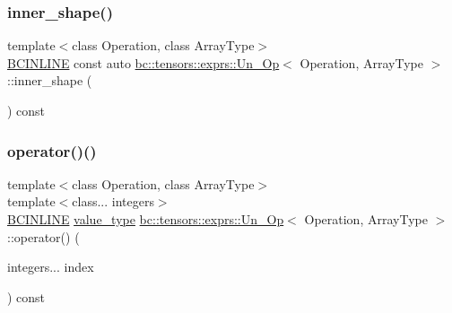 \subsubsection{\texorpdfstring{inner\+\_\+shape()}{inner\_shape()}}
{\footnotesize\ttfamily template$<$class Operation, class Array\+Type$>$ \\
\hyperlink{common_8h_a6699e8b0449da5c0fafb878e59c1d4b1}{B\+C\+I\+N\+L\+I\+NE} const auto \hyperlink{structbc_1_1tensors_1_1exprs_1_1Un__Op}{bc\+::tensors\+::exprs\+::\+Un\+\_\+\+Op}$<$ Operation, Array\+Type $>$\+::inner\+\_\+shape (\begin{DoxyParamCaption}{ }\end{DoxyParamCaption}) const\hspace{0.3cm}{\ttfamily [inline]}}

\mbox{\label{structbc_1_1tensors_1_1exprs_1_1Un__Op_a7c9d055f60de762c1b5e2eb46f1603f2}} 
\subsubsection{\texorpdfstring{operator()()}{operator()()}\hspace{0.1cm}{\footnotesize\ttfamily [1/2]}}
{\footnotesize\ttfamily template$<$class Operation, class Array\+Type$>$ \\
template$<$class... integers$>$ \\
\hyperlink{common_8h_a6699e8b0449da5c0fafb878e59c1d4b1}{B\+C\+I\+N\+L\+I\+NE} \hyperlink{structbc_1_1tensors_1_1exprs_1_1Un__Op_a8c87b36ec972937cd789e6517fb47369}{value\+\_\+type} \hyperlink{structbc_1_1tensors_1_1exprs_1_1Un__Op}{bc\+::tensors\+::exprs\+::\+Un\+\_\+\+Op}$<$ Operation, Array\+Type $>$\+::operator() (\begin{DoxyParamCaption}\item[{integers...}]{index }\end{DoxyParamCaption}) const\hspace{0.3cm}{\ttfamily [inline]}}

\mbox{\label{structbc_1_1tensors_1_1exprs_1_1Un__Op_a23addbb1769304e2004f15abd506108f}} 
